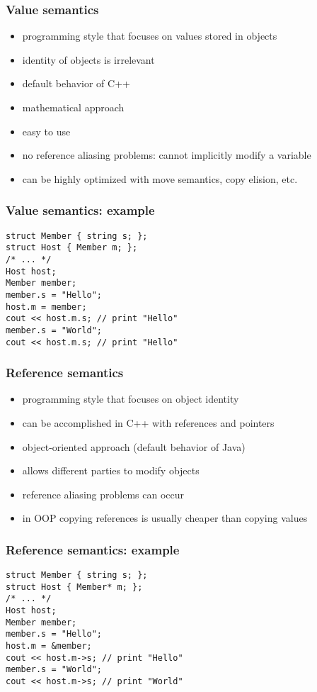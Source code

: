 \begin{frame}[fragile]
    \frametitle{Value semantics}
    \begin{itemize}
        \item programming style that focuses on values stored in objects
        \item identity of objects is irrelevant
        \item default behavior of C++
        \item mathematical approach
        \item easy to use
        \item no reference aliasing problems: cannot implicitly modify a variable
        \item can be highly optimized with move semantics, copy elision, etc.
    \end{itemize}
\end{frame}

\begin{frame}[fragile]
    \frametitle{Value semantics: example}
        \begin{lstlisting}
struct Member { string s; };
struct Host { Member m; };
/* ... */
Host host;
Member member;
member.s = "Hello";
host.m = member;
cout << host.m.s; // print "Hello"
member.s = "World";
cout << host.m.s; // print "Hello"
        \end{lstlisting}
\end{frame}

\begin{frame}[fragile]
    \frametitle{Reference semantics}
    \begin{itemize}
        \item programming style that focuses on object identity
        \item can be accomplished in C++ with references and pointers
        \item object-oriented approach (default behavior of Java)
        \item allows different parties to modify objects
        \item reference aliasing problems can occur
        \item in OOP copying references is usually cheaper than copying values
    \end{itemize}
\end{frame}

\begin{frame}[fragile]
    \frametitle{Reference semantics: example}
        \begin{lstlisting}
struct Member { string s; };
struct Host { Member* m; };
/* ... */
Host host;
Member member;
member.s = "Hello";
host.m = &member;
cout << host.m->s; // print "Hello"
member.s = "World";
cout << host.m->s; // print "World"
        \end{lstlisting}
\end{frame}

